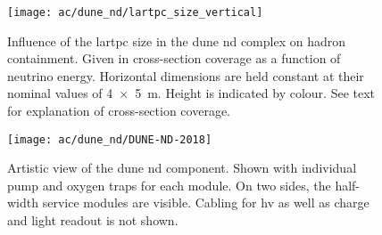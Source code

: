 \begin{figure}[htb]
	\centering
	\texttt{[image: ac/dune\_nd/lartpc\_size\_vertical]}
	\caption[\AC{}   hadron containment]{%
		Influence of the \acrshort{lartpc} size in the \acrshort{dune} \acrshort{nd} complex on hadron containment.
		Given in cross-section coverage as a function of neutrino energy.
		Horizontal dimensions are held constant at their nominal values of \SI{4 x 5}{\metre}.
		Height is indicated by colour.
		See text for explanation of cross-section coverage.~\cite{lartpcSizeChris}
	}
	\label{fig:dune-nd_lartpc-size}
\end{figure}

\begin{figure}[htb]
	\centering
	\texttt{[image: ac/dune\_nd/DUNE-ND-2018]}
	\caption[\AC{}   artistic view]{%
		Artistic view of the \acrshort{dune} \acrshort{nd} \AC{} component.
		Shown with individual pump and oxygen traps for each module.
		On two sides, the half-width service modules are visible.
		Cabling for \acrshort{hv} as well as charge and light readout is not shown.
	}
	\label{fig:dune-nd_ac}
\end{figure}

